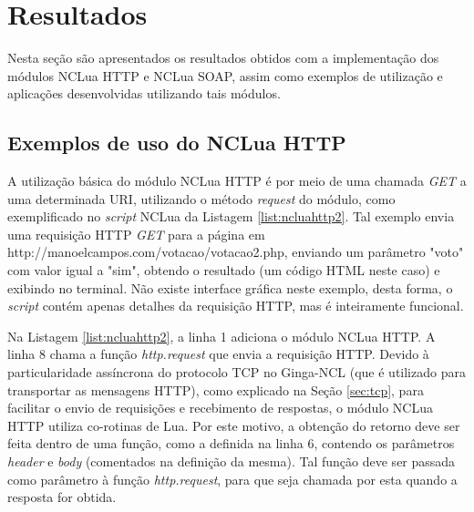 \begin{comment}
A Figura \ref{fig:class-diagram-ncluasoap-ncluahttp} apresenta um diagrama de classes
dos módulos implementados e suas dependências. Nele pode-se ver que são utilizados
mais dois módulos auxiliares: util e base64, o primeiro contendo funções de uso geral
e o outro contendo rotinas para codificação e decoficação de dados em formato base64,
utilizado, por exemplo, na criptografia da senha do usuário em requisições que requerem autentição HTTP.

\begin{center}
	\texttt{[image: ncluasoap-class-diagram.png]}
	\captionof{figure}{Diagrama de Classes do NCLua SOAP e NCLua HTTP}
	\label{fig:class-diagram-ncluasoap-ncluahttp}
\end{center}
\end{comment}

\section{Resultados} \label{sec:resultados}

Nesta seção são apresentados os resultados obtidos com a implementação dos módulos NCLua HTTP e NCLua SOAP,
assim como exemplos de utilização e aplicações desenvolvidas utilizando tais módulos.

\subsection{Exemplos de uso do NCLua HTTP}

A utilização básica do módulo NCLua HTTP é por meio de uma chamada \textit{GET}
a uma determinada URI, utilizando o método \textit{request} do módulo, como exemplificado no \textit{script}
NCLua da Listagem \ref{list:ncluahttp2}. Tal exemplo envia uma requisição HTTP \textit{GET} para a página
em http://manoelcampos.com/votacao/votacao2.php, enviando um parâmetro "voto" com valor igual a "sim",
obtendo o resultado (um código HTML neste caso) e exibindo no terminal. 
Não existe interface gráfica neste exemplo, 
desta forma, o \textit{script} contém apenas detalhes da requisição HTTP, mas é inteiramente funcional.

Na Listagem \ref{list:ncluahttp2}, a linha 1 adiciona o módulo NCLua HTTP. 
A linha 8 chama a função \textit{http.request}
que envia a requisição HTTP. Devido à particularidade assíncrona
do protocolo TCP no Ginga-NCL (que é utilizado para transportar as mensagens HTTP), como explicado na Seção \ref{sec:tcp},
para facilitar o envio de requisições e recebimento de respostas,
o módulo NCLua HTTP utiliza co-rotinas de Lua. 
Por este motivo, a obtenção do retorno deve ser feita dentro de uma função, como
a definida na linha 6, contendo os parâmetros \textit{header} e \textit{body} (comentados na definição
da mesma). Tal função deve ser passada como parâmetro à função \textit{http.request}, para que seja
chamada por esta quando a resposta for obtida. 

